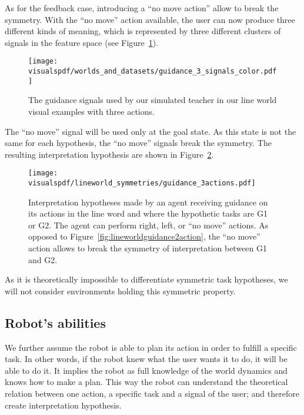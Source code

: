 As for the feedback case, introducing a ``no move action'' allow to break the symmetry. With the ``no move'' action available, the user can now produce three different kinds of meaning, which is represented by three different clusters of signals in the feature space (see Figure~\ref{fig:lineworldguidance3signals}). 

\begin{figure}[!htbp]
  \centering
  \texttt{[image: \\visualspdf/worlds\_and\_datasets/guidance\_3\_signals\_color.pdf]}
  \caption{The guidance signals used by our simulated teacher in our line world visual examples with three actions.}
  \label{fig:lineworldguidance3signals}
\end{figure}

The ``no move'' signal will be used only at the goal state. As this state is not the same for each hypothesis, the ``no move'' signals break the symmetry. The resulting interpretation hypothesis are shown in Figure~\ref{fig:lineworldguidance3action}.

\begin{figure}[!htbp]
  \centering
  \texttt{[image: \\visualspdf/lineworld\_symmetries/guidance\_3actions.pdf]}
  \caption{Interpretation hypotheses made by an agent receiving guidance on its actions in the line word and where the hypothetic tasks are G1 or G2. The agent can perform right, left, or ``no move'' actions. As opposed to Figure~\ref{fig:lineworldguidance2action}, the ``no move'' action allows to break the symmetry of interpretation between G1 and G2.}
  \label{fig:lineworldguidance3action}
\end{figure}

\transition

As it is theoretically impossible to differentiate symmetric task hypotheses, we will not consider environments holding this symmetric property.

\subsection{Robot's abilities}

We further assume the robot is able to plan its action in order to fulfill a specific task. In other words, if the robot knew what the user wants it to do, it will be able to do it. It implies the robot as full knowledge of the world dynamics and knows how to make a plan. This way the robot can understand the theoretical relation between one action, a specific task and a signal of the user; and therefore create interpretation hypothesis.

